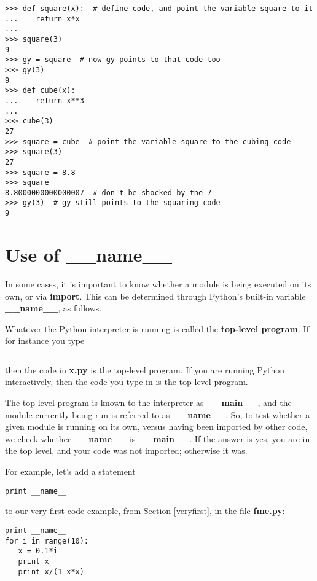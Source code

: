 \begin{Verbatim}[fontsize=\relsize{-2}]
>>> def square(x):  # define code, and point the variable square to it
...    return x*x
...
>>> square(3)
9
>>> gy = square  # now gy points to that code too
>>> gy(3)
9
>>> def cube(x):
...    return x**3
...
>>> cube(3)
27
>>> square = cube  # point the variable square to the cubing code
>>> square(3)
27
>>> square = 8.8
>>> square
8.8000000000000007  # don't be shocked by the 7
>>> gy(3)  # gy still points to the squaring code
9
\end{Verbatim}

\section{Use of {\bf \_\_name\_\_}}
\label{namemain}

In some cases, it is important to know whether a module is being
executed on its own, or via {\bf import}.  This can be determined
through Python's built-in variable {\bf \_\_name\_\_}, as follows.  

Whatever the Python interpreter is running is called the {\bf top-level
program}.  If for instance you type

\begin{Verbatim}[fontsize=\relsize{-2}]
% python x.py
\end{Verbatim}

then the code in {\bf x.py} is the top-level program.  If you are
running Python interactively, then the code you type in is the top-level
program.

The top-level program is known to the interpreter as {\bf \_\_main\_\_},
and the module currently being run is referred to as {\bf \_\_name\_\_}.
So, to test whether a given module is running on its own, versus having
been imported by other code, we check whether {\bf \_\_name\_\_} is {\bf
\_\_main\_\_}.  If the answer is yes, you are in the top level, and your
code was not imported; otherwise it was.

For example, let's add a statement

\begin{Verbatim}[fontsize=\relsize{-2}]
print __name__
\end{Verbatim}

to our very first code example, from Section \ref{veryfirst}, in the
file {\bf fme.py}:

\begin{Verbatim}[fontsize=\relsize{-2}]
print __name__
for i in range(10):
   x = 0.1*i
   print x
   print x/(1-x*x)
\end{Verbatim}

